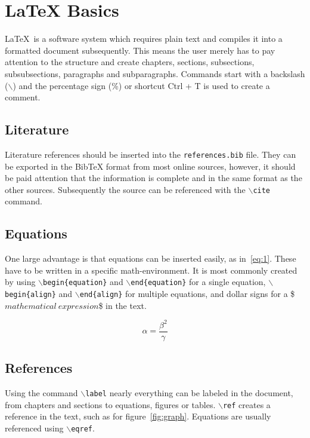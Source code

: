\chapter{LaTeX Basics}\label{app:latex}

\LaTeX\ is a software system which requires plain text and compiles it into a formatted document subsequently. This means the user merely has to pay attention to the structure and create chapters, sections, subsections, subsubsections, paragraphs and subparagraphs. Commands start with a backslash ($\backslash$) and the percentage sign (\%) or shortcut Ctrl + T is used to create a comment. %

\section{Literature}
Literature references should be inserted into the \texttt{references.bib} file. They can be exported in the BibTeX format from most online sources, however, it should be paid attention that the information is complete and in the same format as the other sources. Subsequently the source can be referenced with the \texttt{$\backslash$cite} command.

\section{Equations}

One large advantage is that equations can be inserted easily, as in~\eqref{eq:1}.  These have to be written in a specific math-environment. It is most commonly created by using \texttt{$\backslash$begin\{equation\}} and \texttt{$\backslash$end\{equation\}} for a single equation, \texttt{$\backslash$begin\{align\}} and \texttt{$\backslash$end\{align\}} for multiple equations, and dollar signs for a \$$mathematical\ expression$\$ in the text.

\begin{equation}
\alpha = \frac{\beta^2}{\gamma}\label{eq:1}
\end{equation}

\section{References}
Using the command \texttt{$\backslash$label} nearly everything can be labeled in the document, from chapters and sections to equations, figures or tables. \texttt{$\backslash$ref} creates a reference in the text, such as for figure~\ref{fig:graph}. Equations are usually referenced using \texttt{$\backslash$eqref}.

